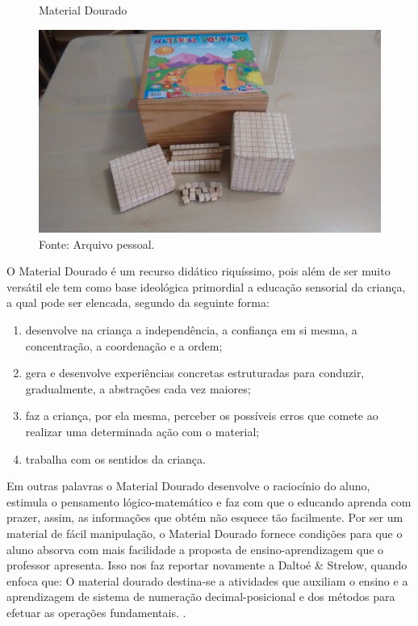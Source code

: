 \begin{refsection}
    \begin{figure}[ht]%
        \centering%
        \caption{Material Dourado}%
        \includegraphics[width=.5\textwidth]{articles/05-material-dourado-com/figura1.jpeg}%
        \caption*{Fonte: Arquivo pessoal.}%
        \label{fig:material-dourado}%
    \end{figure}%

    O Material Dourado é um recurso didático riquíssimo, pois além de ser muito versátil ele tem como base ideológica primordial a educação sensorial da criança, a qual pode ser elencada, segundo \cite[p.~2]{DALTOÉAndStrelowTrabalhando} da seguinte forma:

    \begin{enumerate}
        \item desenvolve na criança a independência, a confiança em si mesma, a concentração, a coordenação e a ordem; 
        \item gera e desenvolve experiências concretas estruturadas para conduzir, gradualmente, a abstrações cada vez maiores;
        \item faz a criança, por ela mesma, perceber os possíveis erros que comete ao realizar uma determinada ação com o material; 
        \item trabalha com os sentidos da criança.
    \end{enumerate}

    Em outras palavras o Material Dourado desenvolve o raciocínio do aluno, estimula o pensamento lógico-matemático e faz com que o educando aprenda com prazer, assim, as informações que obtém não esquece tão facilmente. Por ser um material de fácil manipulação, o Material Dourado fornece condições para que o aluno absorva com mais facilidade a proposta de ensino-apren\-di\-za\-gem que o professor apresenta. Isso nos faz reportar novamente a Daltoé \& Strelow, quando enfoca que: O material dourado destina-se a atividades que auxiliam o ensino e a aprendizagem de sistema de numeração decimal-posicional e dos métodos para efetuar as operações fundamentais. \cite[p.~3]{DALTOÉAndStrelowTrabalhando}.


\end{refsection}
